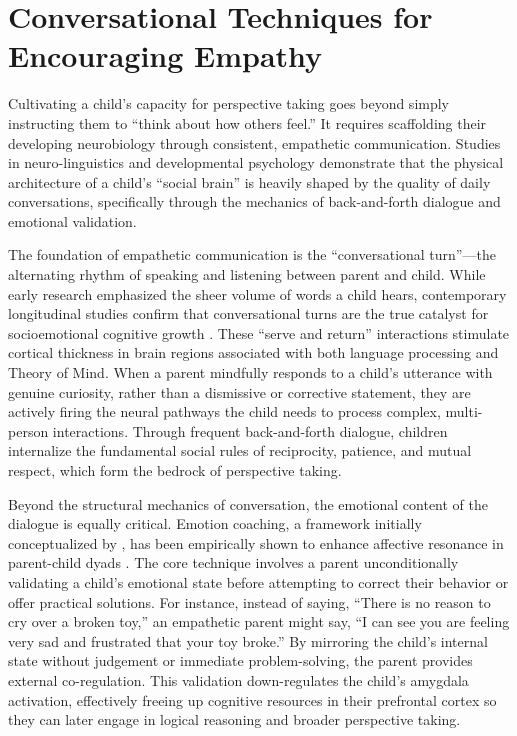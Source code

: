 \section{Conversational Techniques for Encouraging Empathy}

Cultivating a child's capacity for perspective taking goes beyond simply instructing them to ``think about how others feel.'' 
It requires scaffolding their developing neurobiology through consistent, empathetic communication. 
Studies in neuro-linguistics and developmental psychology demonstrate that the physical architecture of a child's ``social brain'' is heavily shaped by the quality of daily conversations, specifically through the mechanics of back-and-forth dialogue and emotional validation.

The foundation of empathetic communication is the ``conversational turn''---the alternating rhythm of speaking and listening between parent and child.
While early research emphasized the sheer volume of words a child hears, contemporary longitudinal studies confirm that conversational turns are the true catalyst for socioemotional cognitive growth \citep{romeo2024}.
These ``serve and return'' interactions stimulate cortical thickness in brain regions associated with both language processing and Theory of Mind.
When a parent mindfully responds to a child's utterance with genuine curiosity, rather than a dismissive or corrective statement, they are actively firing the neural pathways the child needs to process complex, multi-person interactions.
Through frequent back-and-forth dialogue, children internalize the fundamental social rules of reciprocity, patience, and mutual respect, which form the bedrock of perspective taking.

Beyond the structural mechanics of conversation, the emotional content of the dialogue is equally critical. 
Emotion coaching, a framework initially conceptualized by \citet{gottman1997}, has been empirically shown to enhance affective resonance in parent-child dyads \citep{schimmel2025}.
The core technique involves a parent unconditionally validating a child's emotional state before attempting to correct their behavior or offer practical solutions.
For instance, instead of saying, ``There is no reason to cry over a broken toy,'' an empathetic parent might say, ``I can see you are feeling very sad and frustrated that your toy broke.''
By mirroring the child's internal state without judgement or immediate problem-solving, the parent provides external co-regulation.
This validation down-regulates the child's amygdala activation, effectively freeing up cognitive resources in their prefrontal cortex so they can later engage in logical reasoning and broader perspective taking.

